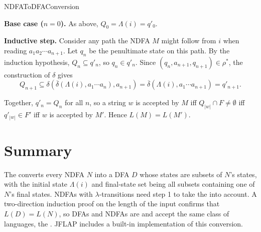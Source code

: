 \documentclass[hidelinks]{article}
\begin{document}
\begin{smodule}[title={NDFA to DFA Conversion}]{NDFAToDFAConversion}
\begin{sparagraph}[title={Proof: $Q_n \subseteq q'_n$}]
\textbf{Base case ($n = 0$).} As above, $Q_0 = \Lambda(i) = q'_0$.

\textbf{Inductive step.} Consider any path the NDFA $M$ might follow from $i$ when reading $a_1 a_2 \cdots a_{n+1}$. Let $q_n$ be the penultimate state on this path. By the induction hypothesis, $Q_n \subseteq q'_n$, so $q_n \in q'_n$. Since $(q_n, a_{n+1}, q_{n+1}) \in \rho^*$, the construction of $\delta$ gives
\[
Q_{n+1} \subseteq \delta(\overline{\delta}(\Lambda(i), a_1 \cdots a_n), a_{n+1}) = \overline{\delta}(\Lambda(i), a_1 \cdots a_{n+1}) = q'_{n+1}.
\]
\end{sparagraph}

Together, $q'_n = Q_n$ for all $n$, so a string $w$ is accepted by $M$ iff $Q_{|w|} \cap F \neq \emptyset$ iff $q'_{|w|} \in F'$ iff $w$ is accepted by $M'$. Hence $L(M) = L(M')$.

\section{Summary}

The  converts every NDFA $N$ into a DFA $D$ whose states are subsets of $N$'s states, with the initial state $\Lambda(i)$ and final-state set being all subsets containing one of $N$'s final states. NDFAs with $\lambda$-transitions need step 1 to take the  into account. A two-direction induction proof on the length of the input confirms that $L(D) = L(N)$, so DFAs and NDFAs are  and accept the same class of languages, the . JFLAP includes a built-in implementation of this conversion.

\end{smodule}
\end{document}
